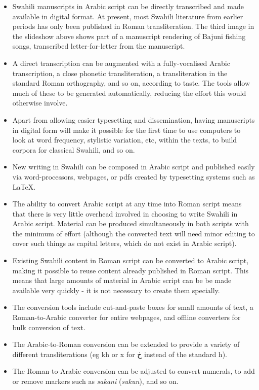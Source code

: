 \documentclass[a4paper,10pt]{article}
\newcommand{\AS}[1]{\fontspec[Script=Arabic, Scale=1.5]{Scheherazade} #1\normalfont} %
\begin{document}
\begin{itemize}
 \item Swahili manuscripts in Arabic script can be directly transcribed and made available in digital format. At present, most Swahili literature from earlier periods has only been published in Roman transliteration. The third image in the slideshow above shows part of a manuscript rendering of Bajuni fishing songs, transcribed letter-for-letter from the manuscript.

 \item A direct transcription can be augmented with a fully-vocalised Arabic transcription, a close phonetic transliteration, a transliteration in the standard Roman orthography, and so on, according to taste. The tools allow much of these to be generated automatically, reducing the effort this would otherwise involve.

 \item Apart from allowing easier typesetting and dissemination, having manuscripts in digital form will make it possible for the first time to use computers to look at word frequency, stylistic variation, etc, within the texts, to build corpora for classical Swahili, and so on.

 \item New writing in Swahili can be composed in Arabic script and published easily via word-processors, webpages, or pdfs created by typesetting systems such as LaTeX.

 \item The ability to convert Arabic script at any time into Roman script means that there is very little overhead involved in choosing to write Swahili in Arabic script. Material can be produced simultaneously in both scripts with the minimum of effort (although the converted text will need minor editing to cover such things as capital letters, which do not exist in Arabic script).

 \item Existing Swahili content in Roman script can be converted to Arabic script, making it possible to reuse content already published in Roman script. This means that large amounts of material in Arabic script can be be made available very quickly - it is not necessary to create them specially.

 \item The conversion tools include cut-and-paste boxes for small amounts of text, a Roman-to-Arabic converter for entire webpages, and offline converters for bulk conversion of text.

 \item The Arabic-to-Roman conversion can be extended to provide a variety of different transliterations (eg kh or x for \AS{خ} instead of the standard h).

 \item The Roman-to-Arabic conversion can be adjusted to convert numerals, to add or remove markers such as \textit{sakani} (\textit{sukun}), and so on.
\end{itemize}
\end{document}
